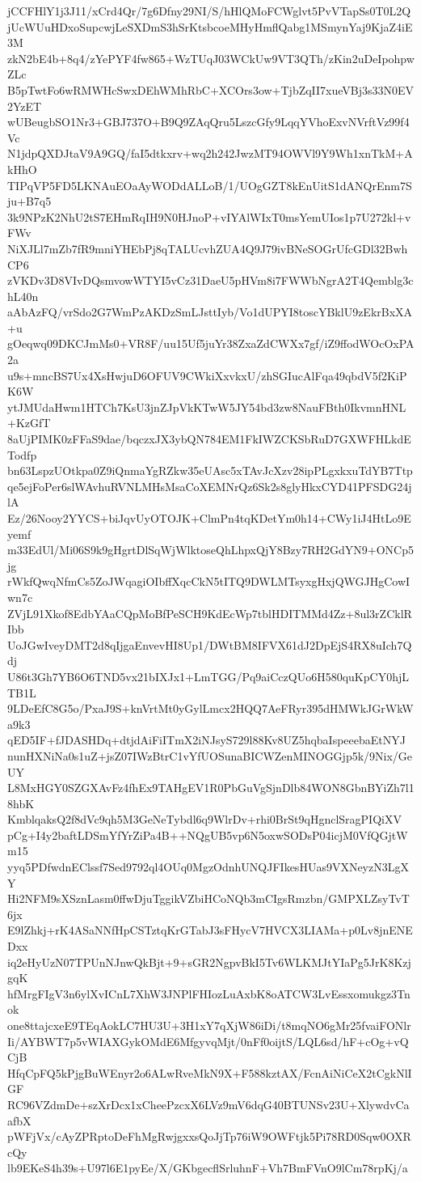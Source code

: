 jCCFHlY1j3J11/xCrd4Qr/7g6Dfny29NI/S/hHlQMoFCWglvt5PvVTapSs0T0L2Q
jUcWUuHDxoSupcwjLeSXDmS3hSrKtsbcoeMHyHmflQabg1MSmynYaj9KjaZ4iE3M
zkN2bE4b+8q4/zYePYF4fw865+WzTUqJ03WCkUw9VT3QTh/zKin2uDeIpohpwZLc
B5pTwtFo6wRMWHcSwxDEhWMhRbC+XCOrs3ow+TjbZqII7xueVBj3s33N0EV2YzET
wUBeugbSO1Nr3+GBJ737O+B9Q9ZAqQru5LszcGfy9LqqYVhoExvNVrftVz99f4Vc
N1jdpQXDJtaV9A9GQ/faI5dtkxrv+wq2h242JwzMT94OWVl9Y9Wh1xnTkM+AkHhO
TIPqVP5FD5LKNAuEOaAyWODdALLoB/1/UOgGZT8kEnUitS1dANQrEnm7Sju+B7q5
3k9NPzK2NhU2tS7EHmRqIH9N0HJnoP+vIYAlWIxT0msYemUIos1p7U272kl+vFWv
NiXJLl7mZb7fR9mniYHEbPj8qTALUcvhZUA4Q9J79ivBNeSOGrUfcGDl32BwhCP6
zVKDv3D8VIvDQsmvowWTYI5vCz31DaeU5pHVm8i7FWWbNgrA2T4Qemblg3chL40n
aAbAzFQ/vrSdo2G7WmPzAKDzSmLJsttIyb/Vo1dUPYI8toscYBklU9zEkrBxXA+u
gOeqwq09DKCJmMs0+VR8F/uu15Uf5juYr38ZxaZdCWXx7gf/iZ9ffodWOcOxPA2a
u9s+mncBS7Ux4XsHwjuD6OFUV9CWkiXxvkxU/zhSGIucAlFqa49qbdV5f2KiPK6W
ytJMUdaHwm1HTCh7KsU3jnZJpVkKTwW5JY54bd3zw8NauFBth0IkvmnHNL+KzGfT
8aUjPIMK0zFFaS9dae/bqczxJX3ybQN784EM1FkIWZCKSbRuD7GXWFHLkdETodfp
bn63LspzUOtkpa0Z9iQnmaYgRZkw35eUAsc5xTAvJcXzv28ipPLgxkxuTdYB7Ttp
qe5ejFoPer6slWAvhuRVNLMHsMsaCoXEMNrQz6Sk2s8glyHkxCYD41PFSDG24jlA
Ez/26Nooy2YYCS+biJqvUyOTOJK+ClmPn4tqKDetYm0h14+CWy1iJ4HtLo9Eyemf
m33EdUl/Mi06S9k9gHgrtDlSqWjWlktoseQhLhpxQjY8Bzy7RH2GdYN9+ONCp5jg
rWkfQwqNfmCs5ZoJWqagiOIbffXqcCkN5tITQ9DWLMTsyxgHxjQWGJHgCowIwn7c
ZVjL91Xkof8EdbYAaCQpMoBfPeSCH9KdEcWp7tblHDITMMd4Zz+8ul3rZCklRIbb
UoJGwIveyDMT2d8qIjgaEnvevHI8Up1/DWtBM8IFVX61dJ2DpEjS4RX8uIch7Qdj
U86t3Gh7YB6O6TND5vx21bIXJx1+LmTGG/Pq9aiCczQUo6H580quKpCY0hjLTB1L
9LDeEfC8G5o/PxaJ9S+knVrtMt0yGylLmcx2HQQ7AeFRyr395dHMWkJGrWkWa9k3
qED5IF+fJDASHDq+dtjdAiFiITmX2iNJsyS729l88Kv8UZ5hqbaIspeeebaEtNYJ
nunHXNiNa0s1uZ+jsZ07IWzBtrC1vYfUOSunaBICWZenMINOGGjp5k/9Nix/GeUY
L8MxHGY0SZGXAvFz4fhEx9TAHgEV1R0PbGuVgSjnDlb84WON8GbnBYiZh7l18hbK
KmblqaksQ2f8dVc9qh5M3GeNeTybdl6q9WlrDv+rhi0BrSt9qHgnclSragPIQiXV
pCg+I4y2baftLDSmYfYrZiPa4B++NQgUB5vp6N5oxwSODsP04icjM0VfQGjtWm15
yyq5PDfwdnEClssf7Sed9792ql4OUq0MgzOdnhUNQJFIkesHUas9VXNeyzN3LgXY
Hi2NFM9sXSznLasm0ffwDjuTggikVZbiHCoNQb3mCIgsRmzbn/GMPXLZsyTvT6jx
E9lZhkj+rK4ASaNNfHpCSTztqKrGTabJ3sFHycV7HVCX3LIAMa+p0Lv8jnENEDxx
iq2eHyUzN07TPUnNJnwQkBjt+9+sGR2NgpvBkI5Tv6WLKMJtYIaPg5JrK8KzjgqK
hfMrgFIgV3n6ylXvICnL7XhW3JNPlFHIozLuAxbK8oATCW3LvEssxomukgz3Tnok
one8ttajcxeE9TEqAokLC7HU3U+3H1xY7qXjW86iDi/t8mqNO6gMr25fvaiFONlr
Ii/AYBWT7p5vWIAXGykOMdE6MfgyvqMjt/0nFf0oijtS/LQL6sd/hF+cOg+vQCjB
HfqCpFQ5kPjgBuWEnyr2o6ALwRveMkN9X+F588kztAX/FcnAiNiCeX2tCgkNlIGF
RC96VZdmDe+szXrDcx1xCheePzcxX6LVz9mV6dqG40BTUNSv23U+XlywdvCaafbX
pWFjVx/cAyZPRptoDeFhMgRwjgxxsQoJjTp76iW9OWFtjk5Pi78RD0Sqw0OXRcQy
lb9EKeS4h39s+U97l6E1pyEe/X/GKbgecflSrluhnF+Vh7BmFVnO9lCm78rpKj/a
